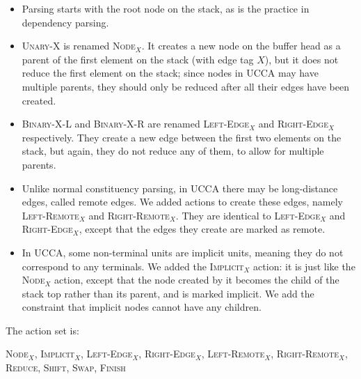 \documentclass[11pt]{article}
\begin{document}
\begin{itemize}
	\item Parsing starts with the root node on the stack, as is the practice in dependency parsing.
	\item \textsc{Unary-X} is renamed \textsc{Node$_X$}. It creates a new node on the buffer head as a parent of the first element on the stack (with edge tag $X$), but it does not reduce the first element on the stack; since nodes in UCCA may have multiple parents, they should only be reduced after all their edges have been created.
	\item \textsc{Binary-X-L} and \textsc{Binary-X-R} are renamed \textsc{Left-Edge$_X$} and \textsc{Right-Edge$_X$} respectively. They create a new edge between the first two elements on the stack, but again, they do not reduce any of them, to allow for multiple parents.
	\item Unlike normal constituency parsing, in UCCA there may be long-distance edges, called remote edges. We added actions to create these edges, namely \textsc{Left-Remote$_X$} and \textsc{Right-Remote$_X$}. They are identical to \textsc{Left-Edge$_X$} and \textsc{Right-Edge$_X$}, except that the edges they create are marked as remote.
	\item In UCCA, some non-terminal units are implicit units, meaning they do not correspond to any terminals. We added the \textsc{Implicit$_X$} action: it is just like the \textsc{Node$_X$} action, except that the node created by it becomes the child of the stack top rather than its parent, and is marked implicit. We add the constraint that implicit nodes cannot have any children.
\end{itemize}

The action set is:

\textsc{Node$_X$, Implicit$_X$, Left-Edge$_X$, Right-Edge$_X$, Left-Remote$_X$, Right-Remote$_X$, Reduce, Shift, Swap, Finish}
\end{document}

